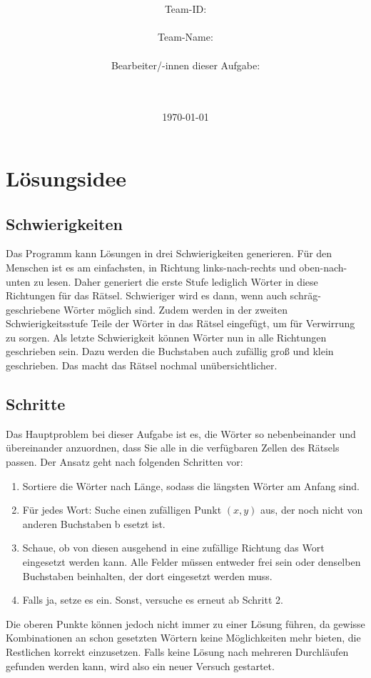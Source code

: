 \documentclass[a4paper,10pt,ngerman]{scrartcl}
\title{\textbf{\Huge\Aufgabe}}
\author{\LARGE Team-ID: \LARGE \TeamId \\\\
	    \LARGE Team-Name: \LARGE \TeamName \\\\
	    \LARGE Bearbeiter/-innen dieser Aufgabe: \\ 
	    \LARGE \Namen\\\\}
\date{\LARGE\today}
\begin{document}
\maketitle
\tableofcontents

\vspace{0.5cm}

\section{Lösungsidee}
\subsection{Schwierigkeiten}
Das Programm kann Lösungen in drei Schwierigkeiten generieren.
Für den Menschen ist es am einfachsten, in Richtung links-nach-rechts und oben-nach-unten zu lesen.
Daher generiert die erste Stufe lediglich Wörter in diese Richtungen für das Rätsel.
Schwieriger wird es dann, wenn auch schräg-geschriebene Wörter möglich sind. Zudem werden in der
zweiten Schwierigkeitsstufe Teile der Wörter in das Rätsel eingefügt, um für Verwirrung zu sorgen.
Als letzte Schwierigkeit können Wörter nun in alle Richtungen geschrieben sein. Dazu werden
die Buchstaben auch zufällig groß und klein geschrieben. Das macht das Rätsel nochmal unübersichtlicher. 
\subsection{Schritte}
Das Hauptproblem bei dieser Aufgabe ist es, die Wörter so nebenbeinander und übereinander anzuordnen, dass
Sie alle in die verfügbaren Zellen des Rätsels passen. Der Ansatz geht nach folgenden Schritten vor:
\begin{enumerate}
	\item Sortiere die Wörter nach Länge, sodass die längsten Wörter am Anfang sind.
	\item Für jedes Wort: Suche einen zufälligen Punkt $(x, y)$ aus, der noch nicht von anderen Buchstaben b
	esetzt ist.
	\item Schaue, ob von diesen ausgehend in eine zufällige Richtung das Wort eingesetzt werden kann. Alle 
	Felder müssen entweder frei sein oder denselben Buchstaben beinhalten, der dort eingesetzt werden muss.
	\item Falls ja, setze es ein. Sonst, versuche es erneut ab Schritt 2.
\end{enumerate}
Die oberen Punkte können jedoch nicht immer zu einer Lösung führen, da gewisse Kombinationen an schon
gesetzten Wörtern keine Möglichkeiten mehr bieten, die Restlichen korrekt einzusetzen.
Falls keine Lösung nach mehreren Durchläufen gefunden werden kann, wird also ein neuer Versuch gestartet.
\end{document}
